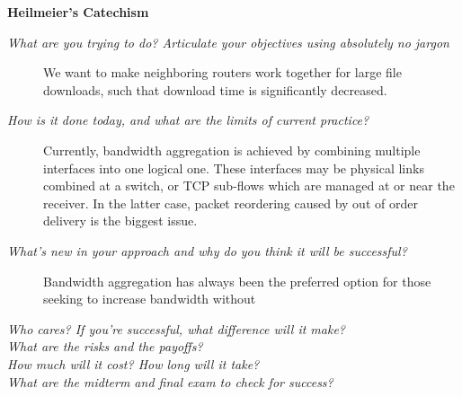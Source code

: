 \documentclass[12pt]{article}
\newcommand{\comment}[1]
{\par {\bfseries \color{blue} #1 \par}}
\begin{document}
\comment{

	{\bf Heilmeier's Catechism}\hfil\\
	\begin{description}
		\item[{\it What are you trying to do? Articulate your objectives using absolutely no jargon}]
			We want to make neighboring routers work together for large file downloads, such that download time is significantly decreased.
		\item[{\it How is it done today, and what are the limits of current practice?\\}]
			Currently, bandwidth aggregation is achieved by combining multiple interfaces into one logical one. These interfaces may be physical links combined at a switch, or TCP sub-flows which are managed at or near the receiver. In the latter case, packet reordering caused by out of order delivery is the biggest issue.

		\item[{\it What's new in your approach and why do you think it will be successful?\\}]

			Bandwidth aggregation has always been the preferred option for those seeking to increase bandwidth without 

		\item[{\it Who cares? If you're successful, what difference will it make?\\}]

		\item[{\it What are the risks and the payoffs?\\}]

		\item[{\it How much will it cost? How long will it take?\\}]

		\item[{\it What are the midterm and final exam to check for success?\\}]


\end{description}}
\end{document}
